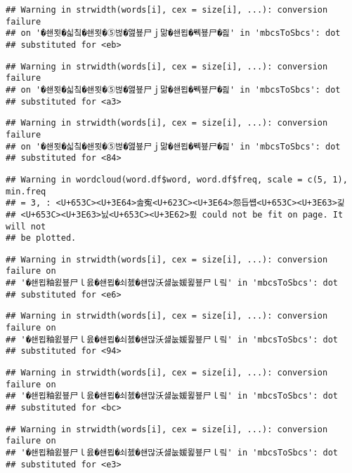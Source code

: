 \documentclass[]{article}
\begin{document}
\begin{verbatim}
## Warning in strwidth(words[i], cex = size[i], ...): conversion failure
## on '�쇈묏�싧칰�쇈묏�⑤벊�앮뵾尸ｊ맒�쇈묍�붹뵾尸�즲' in 'mbcsToSbcs': dot
## substituted for <eb>
\end{verbatim}

\begin{verbatim}
## Warning in strwidth(words[i], cex = size[i], ...): conversion failure
## on '�쇈묏�싧칰�쇈묏�⑤벊�앮뵾尸ｊ맒�쇈묍�붹뵾尸�즲' in 'mbcsToSbcs': dot
## substituted for <a3>
\end{verbatim}

\begin{verbatim}
## Warning in strwidth(words[i], cex = size[i], ...): conversion failure
## on '�쇈묏�싧칰�쇈묏�⑤벊�앮뵾尸ｊ맒�쇈묍�붹뵾尸�즲' in 'mbcsToSbcs': dot
## substituted for <84>
\end{verbatim}

\begin{verbatim}
## Warning in wordcloud(word.df$word, word.df$freq, scale = c(5, 1), min.freq
## = 3, : <U+653C><U+3E64>솚寃<U+623C><U+3E64>怨듭썝<U+653C><U+3E63>긽
## <U+653C><U+3E63>닔<U+653C><U+3E62>룄 could not be fit on page. It will not
## be plotted.
\end{verbatim}

\begin{verbatim}
## Warning in strwidth(words[i], cex = size[i], ...): conversion failure on
## '�쇈묍釉욄뵾尸ｌ읈�쇈묍�쇠쳸�쇈많沃섏눖媛묉뵾尸ｌ맄' in 'mbcsToSbcs': dot
## substituted for <e6>
\end{verbatim}

\begin{verbatim}
## Warning in strwidth(words[i], cex = size[i], ...): conversion failure on
## '�쇈묍釉욄뵾尸ｌ읈�쇈묍�쇠쳸�쇈많沃섏눖媛묉뵾尸ｌ맄' in 'mbcsToSbcs': dot
## substituted for <94>
\end{verbatim}

\begin{verbatim}
## Warning in strwidth(words[i], cex = size[i], ...): conversion failure on
## '�쇈묍釉욄뵾尸ｌ읈�쇈묍�쇠쳸�쇈많沃섏눖媛묉뵾尸ｌ맄' in 'mbcsToSbcs': dot
## substituted for <bc>
\end{verbatim}

\begin{verbatim}
## Warning in strwidth(words[i], cex = size[i], ...): conversion failure on
## '�쇈묍釉욄뵾尸ｌ읈�쇈묍�쇠쳸�쇈많沃섏눖媛묉뵾尸ｌ맄' in 'mbcsToSbcs': dot
## substituted for <e3>
\end{verbatim}
\end{document}
